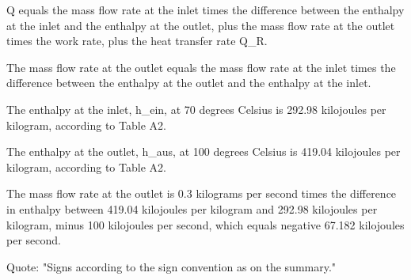 Q equals the mass flow rate at the inlet times the difference between the enthalpy at the inlet and the enthalpy at the outlet, plus the mass flow rate at the outlet times the work rate, plus the heat transfer rate Q_R.

The mass flow rate at the outlet equals the mass flow rate at the inlet times the difference between the enthalpy at the outlet and the enthalpy at the inlet.

The enthalpy at the inlet, h_ein, at 70 degrees Celsius is 292.98 kilojoules per kilogram, according to Table A2.

The enthalpy at the outlet, h_aus, at 100 degrees Celsius is 419.04 kilojoules per kilogram, according to Table A2.

The mass flow rate at the outlet is 0.3 kilograms per second times the difference in enthalpy between 419.04 kilojoules per kilogram and 292.98 kilojoules per kilogram, minus 100 kilojoules per second, which equals negative 67.182 kilojoules per second.

Quote: "Signs according to the sign convention as on the summary."